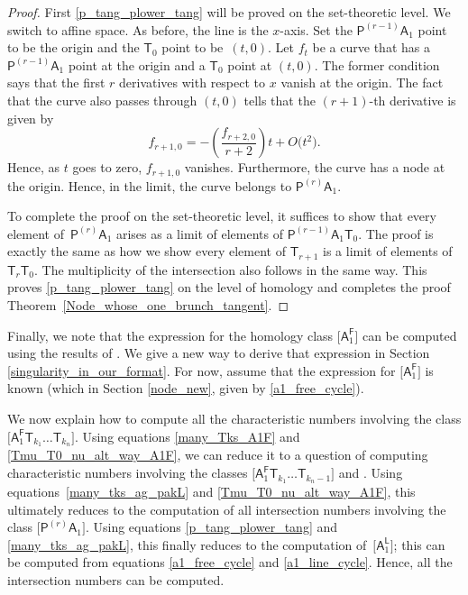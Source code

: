 \documentclass[pdftex]{sigma}
\numberwithin{equation}{section}
\begin{document}
\begin{proof}
First \eqref{p_tang_plower_tang} will be proved on the set-theoretic level.
We switch to affine space. As before, the line is the $x$-axis.
Set the $\mathsf{P}^{(r-1)} \mathsf{A}_1$ point to be the origin
and the $\mathsf{T}_0$ point to be~$(t, 0)$. Let $f_t$ be a curve that has a
$\mathsf{P}^{(r-1)} \mathsf{A}_1$ point at the origin and a $\mathsf{T}_0$ point at $(t, 0)$.
The former condition says that the first $r$ derivatives with respect to $x$ vanish at the origin.
The fact that the curve also passes through $(t, 0)$ tells that the $(r+1)$-th derivative
is given by
\[f_{r+1,0}  =  -\left(\frac{f_{r+2,0}}{r+2}\right)t + O\bigl(t^2\bigr).\]
Hence, as $t$ goes to zero, $f_{r+1,0}$ vanishes. Furthermore, the curve has a node at the origin. Hence, in the limit,
the curve belongs to $\mathsf{P}^{(r)} \mathsf{A}_1$.

To complete the proof on the set-theoretic level, it suffices
to show that every element of~$\mathsf{P}^{(r)} \mathsf{A}_1$ arises as a limit of elements of
$\mathsf{P}^{(r-1)} \mathsf{A}_1 \mathsf{T}_0$. The proof is exactly the same as how we show every element of
$\mathsf{T}_{r+1}$ is a limit of elements of $\mathsf{T}_r \mathsf{T}_0$. The multiplicity of the intersection also follows in the
same way. This proves \eqref{p_tang_plower_tang} on the level of homology and completes the proof Theorem~\ref{Node_whose_one_brunch_tangent}.
\end{proof}

Finally, we note that the expression for the homology class
$\bigl[\mathsf{A}_1^{\mathsf{F}}\bigr]$
can be computed using the
results of \cite{R.M}.
We give a new way to derive that expression in
Section \ref{singularity_in_our_format}.
For now, assume that
the expression for $\bigl[\mathsf{A}_1^{\mathsf{F}}\bigr]$ is known
(which in Section \ref{node_new}, given by \eqref{a1_free_cycle}).

We now explain how to compute
all the characteristic numbers
involving the class $\bigl[\mathsf{A}_1^{\mathsf{F}} \mathsf{T}_{k_1} \dots\allowbreak \mathsf{T}_{k_n}\bigr]$.
Using equations
\eqref{many_Tks_A1F} and \eqref{Tmu_T0_nu_alt_way_A1F}, we can reduce it to a
question of computing characteristic numbers
involving the classes
$\bigl[\mathsf{A}_1^{\mathsf{F}} \mathsf{T}_{k_1} \dots \mathsf{T}_{k_n-1}\bigr]$
and
.
Using equations~\eqref{many_tks_ag_pakL} and \eqref{Tmu_T0_nu_alt_way_A1F}, this
ultimately reduces to
the computation of all intersection numbers involving the class $\bigl[\mathsf{P}^{(r)}\mathsf{A}_1\bigr]$.
Using equations \eqref{p_tang_plower_tang} and
\eqref{many_tks_ag_pakL},
this finally reduces
to the computation of~$\bigl[\mathsf{A}_1^{\mathsf{L}}\bigr]$; this can be computed from
equations \eqref{a1_free_cycle} and
\eqref{a1_line_cycle}. Hence, all the intersection numbers can be computed.
\end{document}

